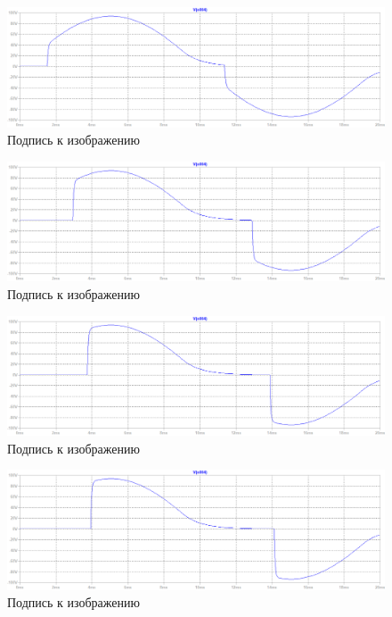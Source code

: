 \documentclass[a4paper, 12pt]{article}
\begin{document}
    \begin{figure}[H]
        \centering
        \includegraphics[scale=0.45]{R2-10k_C10u.png}
        \captionsetup{skip=0pt}
        \caption{Подпись к изображению}
        \label{fig:R2-10k_C10u}
    \end{figure}
    \begin{figure}[H]
        \centering
        \includegraphics[scale=0.45]{R2-60k_C10u.png}
        \captionsetup{skip=0pt}
        \caption{Подпись к изображению}
        \label{fig:R2-60k_C10u}
    \end{figure}
    \begin{figure}[H]
        \centering
        \includegraphics[scale=0.45]{R2-100k_C10u.png}
        \captionsetup{skip=0pt}
        \caption{Подпись к изображению}
        \label{fig:R2-100k_C10u}
    \end{figure}
    \begin{figure}[H]
        \centering
        \includegraphics[scale=0.45]{R2-110k_C10u.png}
        \captionsetup{skip=0pt}
        \caption{Подпись к изображению}
        \label{fig:R2-110k_C10u}
    \end{figure}
\end{document}
